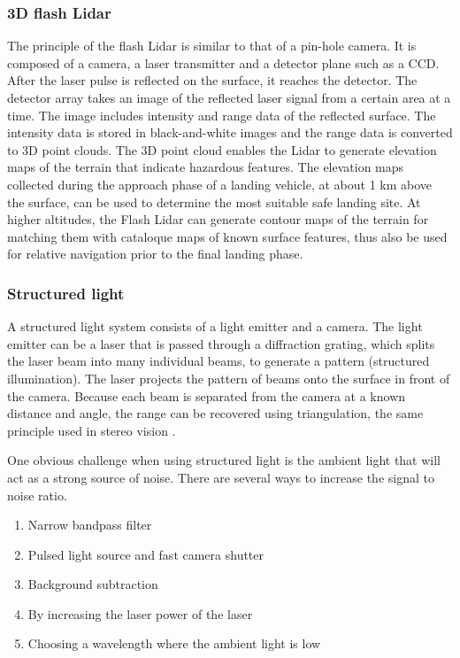 \subsubsection{3D flash Lidar}

The principle of the flash Lidar is similar to that of a pin-hole camera. It is composed of a camera, a laser transmitter and a detector plane such as a CCD. After the laser pulse is reflected on the surface, it reaches the detector. The detector array takes an image of the reflected laser signal from a certain area at a time. The image includes intensity and range data of the reflected surface. The intensity data is stored in black-and-white images and the range data is converted to 3D point clouds. The 3D point cloud enables the Lidar to generate elevation maps of the terrain that indicate hazardous features. The elevation maps collected during the approach phase of a landing vehicle, at about 1 km above the surface, can be used to determine the most suitable safe landing site. At higher altitudes, the Flash Lidar can generate contour maps of the terrain for matching them with cataloque maps of known surface features, thus also be used for relative navigation prior to the final landing phase.

\subsubsection{Structured light}

A structured light system consists of a light emitter and a camera. The light emitter can be a laser that is passed through a diffraction grating, which splits the laser beam into many individual beams, to generate a pattern (structured illumination). The laser projects the pattern of beams onto the surface in front of the camera. Because each beam is separated from the camera at a known distance and angle, the range can be recovered using triangulation, the same principle used in stereo vision \cite{structuredlight}.

One obvious challenge when using structured light is the ambient light that will act as a strong source of noise. There are several ways to increase the signal to noise ratio. 

\begin{enumerate}

\item Narrow bandpass filter
\item Pulsed light source and fast camera shutter
\item Background subtraction
\item By increasing the laser power of the laser
\item Choosing a wavelength where the ambient light is low

\end{enumerate}


